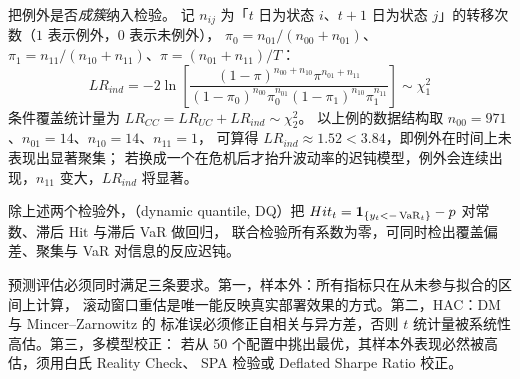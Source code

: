 把例外是否\emph{成簇}纳入检验。
记 $n_{ij}$ 为「$t$ 日为状态 $i$、$t+1$ 日为状态 $j$」的转移次数（$1$ 表示例外，$0$ 表示未例外），
$\pi_0=n_{01}/(n_{00}+n_{01})$、$\pi_1=n_{11}/(n_{10}+n_{11})$、$\pi=(n_{01}+n_{11})/T$：
\begin{equation}\label{eq:09-christoffersen}
  LR_{ind}=-2\ln\!\left[
  \frac{(1-\pi)^{n_{00}+n_{10}}\pi^{n_{01}+n_{11}}}
       {(1-\pi_0)^{n_{00}}\pi_0^{n_{01}}(1-\pi_1)^{n_{10}}\pi_1^{n_{11}}}\right]\sim\chi^{2}_{1}
\end{equation}
条件覆盖统计量为 $LR_{CC}=LR_{UC}+LR_{ind}\sim\chi^2_2$。
以上例的数据结构取 $n_{00}=971$、$n_{01}=14$、$n_{10}=14$、$n_{11}=1$，
可算得 $LR_{ind}\approx 1.52<3.84$，即例外在时间上未表现出显著聚集；
若换成一个在危机后才抬升波动率的迟钝模型，例外会连续出现，$n_{11}$ 变大，$LR_{ind}$ 将显著。

除上述两个检验外，（dynamic quantile, DQ）把
$Hit_t=\mathbf{1}_{\{y_t<-\operatorname{VaR}_t\}}-p$ 对常数、滞后 $\mathrm{Hit}$ 与滞后 VaR 做回归，
联合检验所有系数为零，可同时检出覆盖偏差、聚集与 VaR 对信息的反应迟钝。

\begin{keybox}\label{key:09-eval}
预测评估必须同时满足三条要求。第一，样本外：所有指标只在从未参与拟合的区间上计算，
滚动窗口重估是唯一能反映真实部署效果的方式。第二，HAC：DM 与 Mincer--Zarnowitz 的
标准误必须修正自相关与异方差，否则 $t$ 统计量被系统性高估。第三，多模型校正：
若从 50 个配置中挑出最优，其样本外表现必然被高估，须用白氏 Reality Check、
SPA 检验或 Deflated Sharpe Ratio 校正。
\end{keybox}

